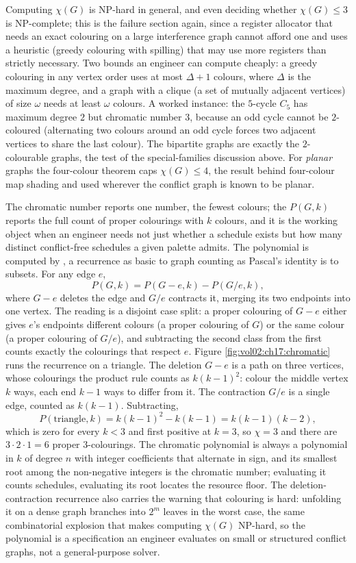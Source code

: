 Computing $\chi(G)$ is NP-hard in general, and even deciding whether
$\chi(G) \leq 3$ is NP-complete; this is the failure section again,
since a register allocator that needs an exact colouring on a large
interference graph cannot afford one and uses a heuristic
(greedy colouring with spilling) that may use more registers than
strictly necessary. Two bounds an engineer can compute cheaply: a
greedy colouring in any vertex order uses at most $\Delta + 1$
colours, where $\Delta$ is the maximum degree, and a graph with a
clique (a set of mutually adjacent vertices) of size $\omega$ needs
at least $\omega$ colours. A worked instance: the $5$-cycle $C_{5}$
has maximum degree $2$ but chromatic number $3$, because an odd
cycle cannot be $2$-coloured (alternating two colours around an odd
cycle forces two adjacent vertices to share the last colour). The
bipartite graphs are exactly the $2$-colourable graphs, the test of
the special-families discussion above. For \emph{planar} graphs the
four-colour theorem caps $\chi(G) \leq 4$, the result behind
four-colour map shading and used wherever the conflict graph is
known to be planar.

The chromatic number reports one number, the fewest colours; the
 $P(G, k)$ reports the full count of
proper colourings with $k$ colours, and it is the working object when
an engineer needs not just whether a schedule exists but how many
distinct conflict-free schedules a given palette admits. The polynomial
is computed by , a recurrence as basic to
graph counting as Pascal's identity is to subsets. For any edge $e$,
\[
P(G, k) = P(G - e, k) - P(G / e, k),
\]
where $G - e$ deletes the edge and $G / e$ contracts it, merging its two
endpoints into one vertex. The reading is a disjoint case split: a
proper colouring of $G - e$ either gives $e$'s endpoints different
colours (a proper colouring of $G$) or the same colour (a proper
colouring of $G / e$), and subtracting the second class from the first
counts exactly the colourings that respect $e$. Figure
\ref{fig:vol02:ch17:chromatic} runs the recurrence on a triangle. The
deletion $G - e$ is a path on three vertices, whose colourings the
product rule counts as $k(k-1)^{2}$: colour the middle vertex $k$ ways,
each end $k - 1$ ways to differ from it. The contraction $G / e$ is a
single edge, counted as $k(k-1)$. Subtracting,
\[
P(\text{triangle}, k) = k(k-1)^{2} - k(k-1) = k(k-1)(k-2),
\]
which is zero for every $k < 3$ and first positive at $k = 3$, so
$\chi = 3$ and there are $3 \cdot 2 \cdot 1 = 6$ proper $3$-colourings.
The chromatic polynomial is always a polynomial in $k$ of degree $n$
with integer coefficients that alternate in sign, and its smallest root
among the non-negative integers is the chromatic number; evaluating it
counts schedules, evaluating its root locates the resource floor. The
deletion-contraction recurrence also carries the warning that colouring
is hard: unfolding it on a dense graph branches into $2^{m}$ leaves in
the worst case, the same combinatorial explosion that makes computing
$\chi(G)$ NP-hard, so the polynomial is a specification an engineer
evaluates on small or structured conflict graphs, not a general-purpose
solver.

